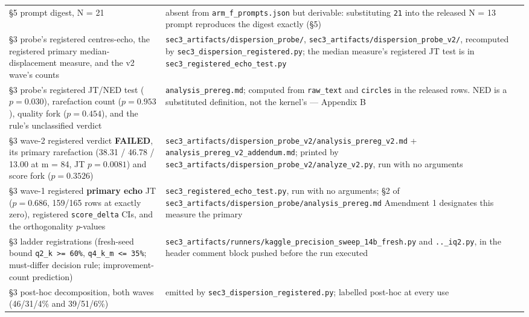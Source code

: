 \begin{longtable}{@{}p{}p{}@{}}
\S5 prompt digest, N = 21 &
absent from \texttt{arm\_f\_prompts.json} but derivable: substituting \texttt{21} into the released N = 13 prompt reproduces the digest exactly (\S5) \\

\S3 probe's registered centres-echo, the registered primary median-displacement measure, and the v2 wave's counts &
\texttt{sec3\_artifacts/dispersion\_probe/}, \texttt{sec3\_\bk{}artifacts/\bk{}dispersion\_\bk{}probe\_\bk{}v2/\bk{}}, recomputed by \texttt{sec3\_dispersion\_registered.py}; the median measure's registered JT test is in \texttt{sec3\_registered\_echo\_test.py} \\

\S3 probe's registered JT/NED test ($p = 0.030$), rarefaction count ($p = 0.953$), quality fork ($p = 0.454$), and the rule's unclassified verdict &
\texttt{analysis\_prereg.md}; computed from \texttt{raw\_text} and \texttt{circles} in the released rows. NED is a substituted definition, not the kernel's --- Appendix B \\

\S3 wave-2 registered verdict \textbf{FAILED}, its primary rarefaction (38.31 / 46.78 / 13.00 at m = 84, JT $p = 0.0081$) and score fork ($p = 0.3526$) &
\texttt{sec3\_\bk{}artifacts/\bk{}dispersion\_\bk{}probe\_\bk{}v2/\bk{}analysis\_\bk{}prereg\_\bk{}v2.md} + \texttt{analysis\_prereg\_v2\_addendum.md}; printed by \texttt{sec3\_\bk{}artifacts/\bk{}dispersion\_\bk{}probe\_\bk{}v2/\bk{}analyze\_\bk{}v2.py}, run with no arguments \\

\S3 wave-1 registered \textbf{primary echo} JT ($p = 0.686$, 159/165 rows at exactly zero), registered \texttt{score\_delta} CIs, and the orthogonality \emph{p}-values &
\texttt{sec3\_registered\_echo\_test.py}, run with no arguments; \S2 of \texttt{sec3\_\bk{}artifacts/\bk{}dispersion\_\bk{}probe/\bk{}analysis\_\bk{}prereg.md} Amendment 1 designates this measure the primary \\

\S3 ladder registrations (fresh-seed bound \texttt{q2\_k >= 60\%}, \texttt{q4\_k\_m <= 35\%}; must-differ decision rule; improvement-count prediction) &
\texttt{sec3\_\bk{}artifacts/\bk{}runners/\bk{}kaggle\_\bk{}precision\_\bk{}sweep\_\bk{}14b\_\bk{}fresh.py} and \texttt{..\_iq2.py}, in the header comment block pushed before the run executed \\

\S3 post-hoc decomposition, both waves (46/31/4\% and 39/51/6\%) &
emitted by \texttt{sec3\_dispersion\_registered.py}; labelled post-hoc at every use \\


\end{longtable}
